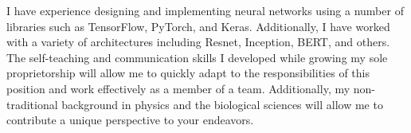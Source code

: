 \begin{cvletter}

  I have experience designing and implementing neural networks using a
  number of libraries such as TensorFlow, PyTorch, and Keras. Additionally,
  I have worked with a variety of architectures including Resnet, Inception,
  BERT, and others. The self-teaching and communication skills I developed
	while growing my sole proprietorship will allow me to quickly adapt
	to the responsibilities of this position and work effectively
	as a member of a team. Additionally, my non-traditional background in physics 
  and the biological sciences will allow me to contribute a unique perspective 
  to your endeavors.

\end{cvletter}
